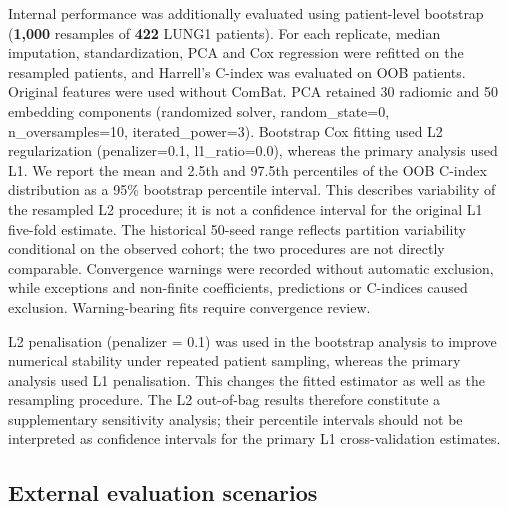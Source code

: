 \documentclass[a4paper,fleqn]{cas-sc}
\begin{document}
Internal performance was additionally evaluated using patient-level bootstrap (\textbf{1,000} resamples of \textbf{422} LUNG1 patients). For each replicate, median imputation, standardization, PCA and Cox regression were refitted on the resampled patients, and Harrell's C-index was evaluated on OOB patients. Original features were used without ComBat. PCA retained 30 radiomic and 50 embedding components (randomized solver, random\_state=0, n\_oversamples=10, iterated\_power=3). Bootstrap Cox fitting used L2 regularization (penalizer=0.1, l1\_ratio=0.0), whereas the primary analysis used L1. We report the mean and 2.5th and 97.5th percentiles of the OOB C-index distribution as a 95\% bootstrap percentile interval. This describes variability of the resampled L2 procedure; it is not a confidence interval for the original L1 five-fold estimate. The historical 50-seed range reflects partition variability conditional on the observed cohort; the two procedures are not directly comparable. Convergence warnings were recorded without automatic exclusion, while exceptions and non-finite coefficients, predictions or C-indices caused exclusion. Warning-bearing fits require convergence review.

L2 penalisation (penalizer = 0.1) was used in the bootstrap analysis to improve numerical stability under repeated patient sampling, whereas the primary analysis used L1 penalisation. This changes the fitted estimator as well as the resampling procedure. The L2 out-of-bag results therefore constitute a supplementary sensitivity analysis; their percentile intervals should not be interpreted as confidence intervals for the primary L1 cross-validation estimates.

\subsection{External evaluation scenarios}
\end{document}
